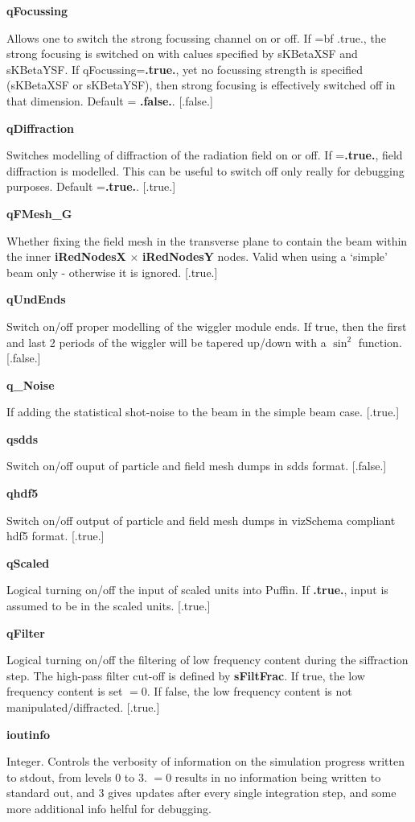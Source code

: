 \documentclass[12pt]{article}%
\begin{document}
{\bf qFocussing}

Allows one to switch the strong focussing channel on or off. If ={bf .true.}, the strong focusing is switched on with calues specified by sKBetaXSF and sKBetaYSF. If qFocussing={\bf .true.}, yet no focussing strength is specified (sKBetaXSF or sKBetaYSF), then strong focusing is effectively switched off in that dimension. Default = {\bf .false.}. [.false.]

{\bf qDiffraction}

Switches modelling of diffraction of the radiation field on or off. If ={\bf .true.}, field diffraction is modelled. This can be useful to switch off only really for debugging purposes. Default ={\bf .true.}. [.true.]

{\bf qFMesh\_G}

Whether fixing the field mesh in the transverse plane to contain the beam within the inner {\bf iRedNodesX} $\times$ {\bf iRedNodesY} nodes. Valid when using a `simple' beam only - otherwise it is ignored. [.true.]

{\bf qUndEnds}

Switch on/off proper modelling of the wiggler module ends. If true, then the first and last 2 periods of the wiggler will be tapered up/down with a $\sin^2$ function. [.false.]

{\bf q\_Noise}

If adding the statistical shot-noise to the beam in the simple beam case. [.true.]

{\bf qsdds}

Switch on/off ouput of particle and field mesh dumps in sdds format. [.false.]

{\bf qhdf5}

Switch on/off output of particle and field mesh dumps in vizSchema compliant hdf5 format. [.true.]

{\bf qScaled}

Logical turning on/off the input of scaled units into Puffin. If {\bf .true.}, input is assumed to be in the scaled units. [.true.]

{\bf qFilter}

Logical turning on/off the filtering of low frequency content during the siffraction step. The high-pass filter cut-off is defined by {\bf sFiltFrac}. If true, the low frequency content is set $=0$. If false, the low frequency content is not manipulated/diffracted. [.true.]

{\bf ioutinfo}

Integer. Controls the verbosity of information on the simulation progress written to stdout, from levels $0$ to $3$. $=0$ results in no information being written to standard out, and $3$ gives updates after every single integration step, and some more additional info helful for debugging.
\end{document}
